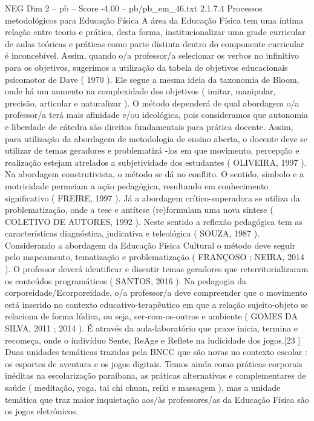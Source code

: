 \begin{textsample}{NEG Dim 2 – pb – Score -4.00 – pb/pb\_em\_46.txt}  \label{ex:f2_neg_002}
2.1.7.4 Processos metodológicos para Educação Física A área da Educação Física tem uma íntima relação entre teoria e prática, desta forma, institucionalizar uma grade curricular de aulas teóricas e práticas como parte distinta dentro do componente curricular é inconcebível.
Assim, quando o/a professor/a selecionar os verbos no infinitivo para os objetivos, sugerimos a utilização da tabela de objetivos educacionais psicomotor de Dave ( 1970 ).
Ele segue a mesma ideia da taxonomia de Bloom, onde há um aumento na complexidade dos objetivos ( imitar, manipular, precisão, articular e naturalizar ).
O método dependerá de qual abordagem o/a professor/a terá mais afinidade e/ou ideológica, pois consideramos que autonomia e liberdade de cátedra são direitos fundamentais para prática docente.
Assim, para utilização da abordagem de metodologia de ensino aberta, o docente deve se utilizar de temas geradores e problematizá -los em que movimento, percepção e realização estejam atrelados a subjetividade dos estudantes ( OLIVEIRA, 1997 ).
Na abordagem construtivista, o método se dá no conflito.
O sentido, símbolo e a motricidade permeiam a ação pedagógica, resultando em conhecimento significativo ( FREIRE, 1997 ).
Já a abordagem crítico-superadora se utiliza da problematização, onde a tese e antítese (re)formulam uma nova síntese ( COLETIVO DE AUTORES, 1992 ).
Neste sentido a reflexão pedagógica tem as características diagnóstica, judicativa e teleológica ( SOUZA, 1987 ).
Considerando a abordagem da Educação Física Cultural o método deve seguir pelo mapeamento, tematização e problematização ( FRANÇOSO ; NEIRA, 2014 ).
O professor deverá identificar e discutir temas geradores que reterritorializaram os conteúdos programáticos ( SANTOS, 2016 ).
Na pedagogia da corporeidade/Ecorporeidade, o/a professor/a deve compreender que o movimento está inserido no contexto educativo-terapêutico em que a relação sujeito-objeto se relaciona de forma lúdica, ou seja, ser-com-os-outros e ambiente ( GOMES DA SILVA, 2011 ; 2014 ).
É através da aula-laboratório que praxe inicia, termina e recomeça, onde o indivíduo Sente, ReAge e Reflete na ludicidade dos jogos.[23 ] Duas unidades temáticas trazidas pela BNCC que são novas no contexto escolar : os esportes de aventura e os jogos digitais.
Temos ainda como práticas corporais inéditas na escolarização paraibana, as práticas alternativas e complementares de saúde ( meditação, yoga, tai chi chuan, reiki e massagem ), mas a unidade temática que traz maior inquietação aos/às professores/as da Educação Física são os jogos eletrônicos.

\end{textsample}
